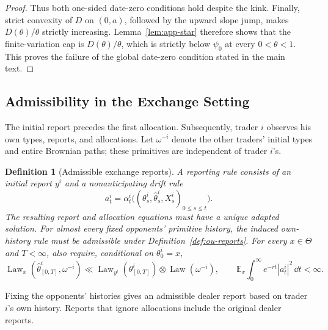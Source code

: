 \documentclass[12pt]{article}
\newtheorem{definition}{Definition}
\newcommand{\E}{\mathbb{E}}
\begin{document}
\begin{proof}
Thus both one-sided date-zero conditions hold despite the kink. Finally,
strict convexity of \(D\) on \((0,a)\), followed by the upward slope jump,
makes \(D(\theta)/\theta\) strictly increasing. Lemma~\ref{lem:app-star}
therefore shows that the finite-variation cap is \(D(\theta)/\theta\), which
is strictly below \(\psi_0\) at every \(0<\theta<1\). This proves the
failure of the global date-zero condition stated in the main text. %
\end{proof}

\subsection{Admissibility in the Exchange Setting}
\label{app:exchange-admissibility}

The initial report precedes the first allocation. Subsequently, trader
\(i\) observes his own types, reports, and allocations. Let
\(\omega^{-i}\) denote the other traders' initial types and entire
Brownian paths; these primitives are independent of trader \(i\)'s.

\begin{definition}[Admissible exchange reports]
\label{def:exchange-reports}
A reporting rule consists of an initial report \(y^i\) and a
nonanticipating drift rule
\[
  a_t^i=\alpha_t^i\bigl(
       (\theta_s^i,\widehat\theta_s^i,X_s^i)_{0\leq s\leq t}\bigr).
\]
The resulting report and allocation equations must have a unique
adapted solution. For almost every fixed opponents' primitive history,
the induced own-history rule must be admissible under
Definition~\ref{def:ou-reports}. For every \(x\in\Theta\) and
\(T<\infty\), also require, conditional on \(\theta_0^i=x\),
\[
  \operatorname{Law}_x(\widehat\theta^i_{[0,T]},\omega^{-i})
  \ll
  \operatorname{Law}_{y^i}(\theta^i_{[0,T]})
       \otimes\operatorname{Law}(\omega^{-i}),
  \qquad
  \E_x\int_0^\infty e^{-rt}|a_t^i|^2\,\dd t<\infty.
\]
\end{definition}

Fixing the opponents' histories gives an admissible dealer report
based on trader \(i\)'s own history.
Reports that ignore allocations include the original dealer reports.
\end{document}
